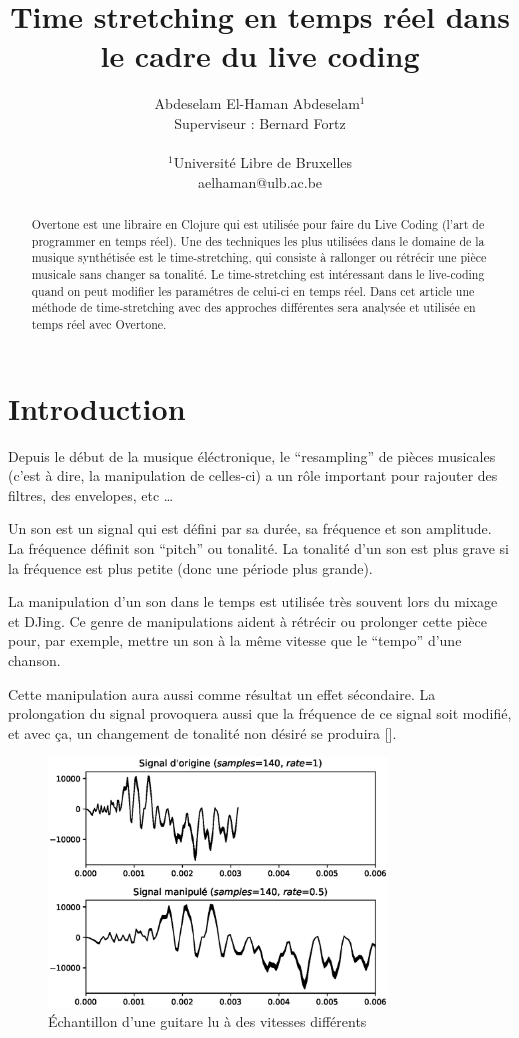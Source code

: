 \documentclass[letterpaper]{article}
\title{Time stretching en temps réel dans le cadre du live coding}
\author{Abdeselam El-Haman Abdeselam$^{1}$\\
Superviseur : Bernard Fortz
\mbox{}\\\\
$^1$Université Libre de Bruxelles \\
aelhaman@ulb.ac.be}
\begin{document}
\maketitle

\begin{abstract}
  Overtone est une libraire en Clojure qui est utilisée pour faire du
  Live Coding (l'art de programmer en temps réel). Une des techniques les
  plus utilisées dans le domaine de la musique synthétisée est le
  time-stretching, qui consiste à rallonger ou rétrécir une pièce musicale
  sans changer sa tonalité. Le time-stretching est intéressant dans
  le live-coding quand on peut modifier les paramétres de celui-ci
  en temps réel. Dans cet article une méthode de time-stretching avec des
  approches différentes sera analysée et utilisée en temps
  réel avec Overtone.

\end{abstract}

\section{Introduction}

  Depuis le début de la musique éléctronique, le ``resampling'' de pièces musicales
  (c'est à dire, la manipulation de celles-ci) a un rôle important pour rajouter des filtres, des
  envelopes, etc \ldots

  Un son est un signal qui est défini par sa durée, sa fréquence et son amplitude. La fréquence
  définit son ``pitch'' ou tonalité. La tonalité d'un son est plus grave si la fréquence est plus
  petite (donc une période plus grande).
  
  La manipulation d'un son dans le temps est utilisée très souvent lors du mixage et DJing.
  Ce genre de manipulations aident à rétrécir ou prolonger cette pièce pour, par exemple, mettre
  un son à la même vitesse que le ``tempo'' d'une chanson.

  Cette manipulation aura aussi comme résultat un effet sécondaire. La prolongation du signal
  provoquera aussi que la fréquence de ce signal soit modifié, et avec ça, un changement
  de tonalité non désiré se produira [\cite{RESAMPLING}].

  \begin{figure}[h]
    \centerline{\includegraphics[width=9cm]{res/fig1.eps}}
    \caption{\label{fig:guitar-stretch}Échantillon d'une guitare lu à des vitesses différents}
  \end{figure}
  
\end{document}

